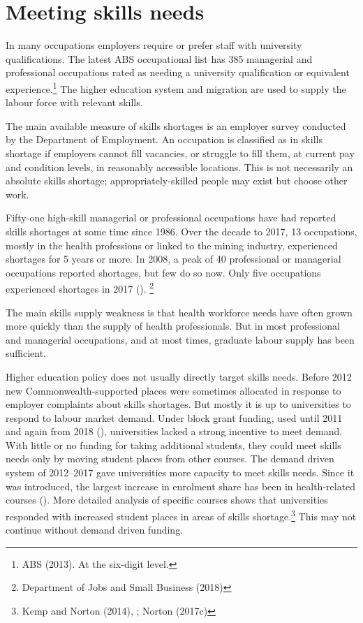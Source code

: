\documentclass{grattan}
\begin{document}
%
\section{Meeting skills needs }\label{sec:meeting-skills-needs}

In many occupations employers require or prefer staff with university qualifications. The latest ABS occupational list has 385 managerial and professional occupations rated as needing a university qualification or equivalent experience.\footnote{ABS (2013). At the six-digit level.} The higher education system and migration are used to supply the labour force with relevant skills.

The main available measure of skills shortages is an employer survey conducted by the Department of Employment. An occupation is classified as in skills shortage if employers cannot fill vacancies, or struggle to fill them, at current pay and condition levels, in reasonably accessible locations. This is not necessarily an absolute skills shortage; appropriately-skilled people may exist but choose other work.

Fifty-one high-skill managerial or professional occupations have had reported skills shortages at some time since 1986. Over the decade to 2017, 13 occupations, mostly in the health professions or linked to the mining industry, experienced shortages for 5 years or more. In 2008, a peak of 40 professional or managerial occupations reported shortages, but few do so now. Only five occupations experienced shortages in 2017 (). \footnote{Department of Jobs and Small Business (2018)}

The main skills supply weakness is that health workforce needs have often grown more quickly than the supply of health professionals. But in most professional and managerial occupations, and at most times, graduate labour supply has been sufficient.

Higher education policy does not usually directly target skills needs. Before 2012 new Commonwealth-supported places were sometimes allocated in response to employer complaints about skills shortages. But mostly it is up to universities to respond to labour market demand. Under block grant funding, used until 2011 and again from 2018 (), universities lacked a strong incentive to meet demand. With little or no funding for taking additional students, they could meet skills needs only by moving student places from other courses. The demand driven system of 2012--2017 gave universities more capacity to meet skills needs. Since it was introduced, the largest increase in enrolment share has been in health-related courses (). More detailed analysis of specific courses shows that universities responded with increased student places in areas of skills shortage.\footnote{Kemp and Norton (2014), ; Norton (2017c)} This may not continue without demand driven funding.
\end{document}
